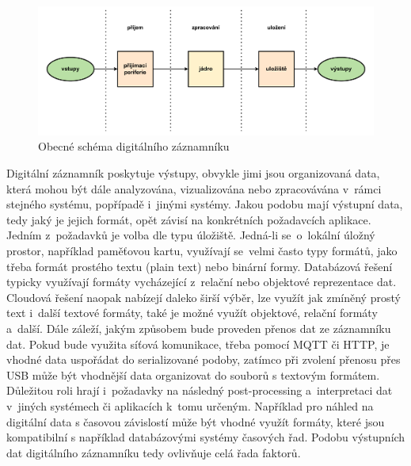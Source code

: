 \begin{figure}[h]
    \centering
    \includegraphics[width=1.00\textwidth]{obrazky-figures/common_digital_datalogger_scheme.pdf}
    \caption{Obecné schéma digitálního záznamníku}
    \label{fig:common-digital-datalogger}
\end{figure}




Digitální záznamník poskytuje výstupy, obvykle jimi jsou organizovaná data, která mohou být dále analyzována, vizualizována nebo zpracovávána v~rámci stejného systému, popřípadě i~jinými systémy. Jakou podobu mají výstupní data, tedy jaký je jejich formát, opět závisí na konkrétních požadavcích aplikace. Jedním z~požadavků je volba dle typu úložiště. Jedná-li se~o~lokální úložný prostor, například paměťovou kartu, využívají se~velmi často typy formátů, jako třeba formát prostého textu (plain text) nebo binární formy. Databázová řešení typicky využívají formáty vycházející z~relační nebo objektové reprezentace dat. Cloudová řešení naopak nabízejí daleko širší výběr, lze využít jak zmíněný prostý text i~další textové formáty, také je možné využít objektové, relační formáty a~další. Dále záleží, jakým způsobem bude proveden přenos dat ze záznamníku dat. Pokud bude využita síťová komunikace, třeba pomocí MQTT či HTTP, je vhodné data uspořádat do serializované podoby, zatímco při zvolení přenosu přes USB může být vhodnější data organizovat do souborů s textovým formátem. Důležitou roli hrají i~požadavky na následný post-processing a~interpretaci dat v~jiných systémech či aplikacích k~tomu určeným. Například pro náhled na digitální data s časovou závislostí může být vhodné využít formáty, které jsou kompatibilní s například databázovými systémy časových řad. Podobu výstupních dat digitálního záznamníku tedy ovlivňuje celá řada faktorů.~\cite{researchgate_general_dataloggger_multiple_sdcards, medium_optimalization_iot_data_storage_timescaledb}

